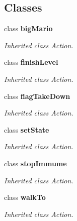 \subsection*{Classes}
\begin{DoxyCompactItemize}
\item 
class {\bfseries big\+Mario}
\begin{DoxyCompactList}\small\item\em Inherited class Action. \end{DoxyCompactList}\item 
class {\bfseries finish\+Level}
\begin{DoxyCompactList}\small\item\em Inherited class Action. \end{DoxyCompactList}\item 
class {\bfseries flag\+Take\+Down}
\begin{DoxyCompactList}\small\item\em Inherited class Action. \end{DoxyCompactList}\item 
class {\bfseries set\+State}
\begin{DoxyCompactList}\small\item\em Inherited class Action. \end{DoxyCompactList}\item 
class {\bfseries stop\+Immume}
\begin{DoxyCompactList}\small\item\em Inherited class Action. \end{DoxyCompactList}\item 
class {\bfseries walk\+To}
\begin{DoxyCompactList}\small\item\em Inherited class Action. \end{DoxyCompactList}\end{DoxyCompactItemize}
